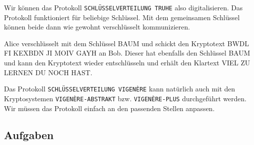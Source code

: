 Wir können das Protokoll \texttt{SCHLÜSSELVERTEILUNG TRUHE} also digitalisieren. Das Protokoll funktioniert für beliebige Schlüssel. Mit dem gemeinsamen Schlüssel können beide dann wie gewohnt verschlüsselt kommunizieren.

\begin{example}
Alice verschlüsselt mit dem Schlüssel BAUM und schickt den Kryptotext BWDL FI KEXBDN JI MOIV GAYH an Bob. Dieser hat ebenfalls den Schlüssel BAUM und kann den Kryptotext wieder entschlüsseln und erhält den Klartext VIEL ZU LERNEN DU NOCH HAST.
\end{example}

\begin{important}
Das Protokoll \texttt{SCHLÜSSELVERTEILUNG VIGENÈRE} kann natürlich auch mit den Kryptosystemen \texttt{VIGENÈRE-ABSTRAKT} bzw. \texttt{VIGENÈRE-PLUS} durchgeführt werden. Wir müssen das Protokoll einfach an den passenden Stellen anpassen.
\end{important}

\subsection{Aufgaben}

